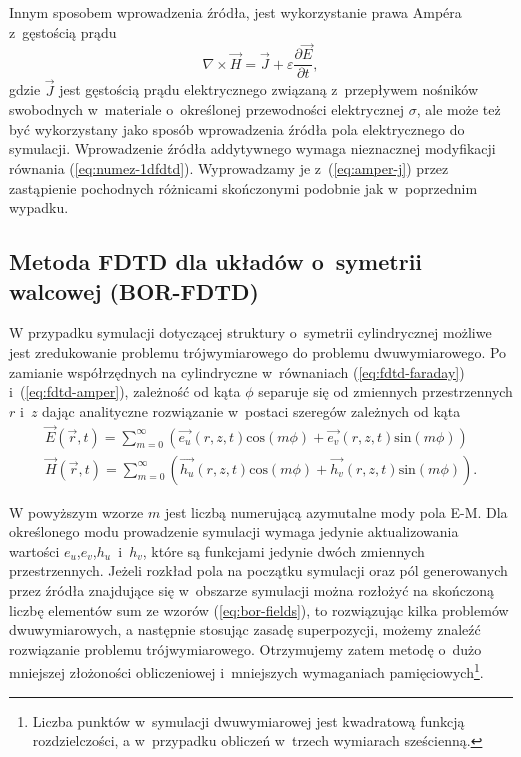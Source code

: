 Innym sposobem wprowadzenia źródła, jest wykorzystanie prawa Amp\'{e}ra z~gęstością prądu
\begin{equation}
\nabla \times \vec{H} = \vec{J} + \varepsilon \frac{\partial \vec{E}}{\partial t},
\label{eq:amper-j}
\end{equation}
gdzie $\vec{J}$ jest gęstością prądu elektrycznego związaną z~przepływem nośników swobodnych w~materiale o~określonej przewodności elektrycznej $\sigma$, ale może też być wykorzystany jako sposób wprowadzenia źródła pola elektrycznego do symulacji. Wprowadzenie źródła addytywnego wymaga nieznacznej modyfikacji równania (\ref{eq:numez-1dfdtd}). Wyprowadzamy je z~(\ref{eq:amper-j}) przez zastąpienie pochodnych różnicami skończonymi podobnie jak w~poprzednim wypadku. 



\subsection{Metoda FDTD dla układów o~symetrii walcowej (BOR-FDTD)}
\label{subart:borfdtd}
W przypadku symulacji dotyczącej struktury o~symetrii cylindrycznej możliwe jest zredukowanie problemu trójwymiarowego do problemu dwuwymiarowego. Po zamianie współrzędnych na cylindryczne w~równaniach (\ref{eq:fdtd-faraday}) i~(\ref{eq:fdtd-amper}), zależność od kąta $\phi$ separuje się od zmiennych przestrzennych $r$ i~$z$ dając analityczne rozwiązanie w~postaci szeregów zależnych od kąta~\cite{taflove1995computational}
\begin{equation}
	\begin{gathered}
	\vec{E}(\vec{r},t)=\sum_{m=0}^{\infty}(\vec{e_u}(r,z,t) \textrm{cos}(m\phi)+\vec{e_v}(r,z,t)\textrm{sin}(m\phi)) \\
	\vec{H}(\vec{r},t)=\sum_{m=0}^{\infty}(\vec{h_u}(r,z,t) \textrm{cos}(m\phi)+\vec{h_v}(r,z,t)\textrm{sin}(m\phi)).
	\end{gathered}
	\label{eq:bor-fields}
\end{equation}

W powyższym wzorze $m$ jest liczbą numerującą azymutalne mody pola E-M. Dla określonego modu prowadzenie symulacji wymaga jedynie aktualizowania wartości $e_u$,$e_v$,$h_u$~i~$h_v$, które są funkcjami jedynie dwóch zmiennych przestrzennych. Jeżeli rozkład pola na początku symulacji oraz pól generowanych przez źródła znajdujące się w~obszarze symulacji można rozłożyć na skończoną liczbę elementów sum ze wzorów (\ref{eq:bor-fields}), to rozwiązując kilka problemów dwuwymiarowych, a następnie stosując zasadę superpozycji, możemy znaleźć rozwiązanie problemu trójwymiarowego. Otrzymujemy zatem metodę o~dużo mniejszej złożoności obliczeniowej i~mniejszych wymaganiach pamięciowych\footnote{Liczba punktów w~symulacji dwuwymiarowej jest kwadratową funkcją rozdzielczości, a w~przypadku obliczeń w~trzech wymiarach sześcienną.}.

